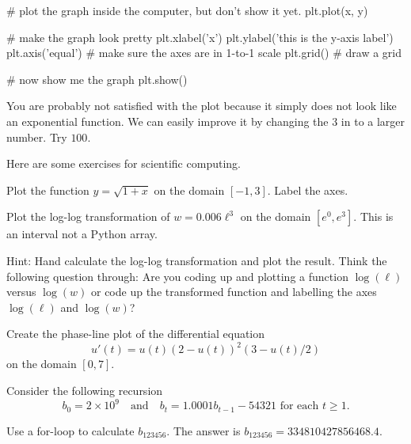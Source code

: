 \documentclass[../main.tex]{subfiles}
\begin{document}
\begin{enumerate}
\begin{pythoncode}
# plot the graph inside the computer, but don't show it yet.
plt.plot(x, y)

# make the graph look pretty
plt.xlabel('x')
plt.ylabel('this is the y-axis label')
plt.axis('equal')    # make sure the axes are in 1-to-1 scale
plt.grid()           # draw a grid

# now show me the graph
plt.show()
    \end{pythoncode}

    You are probably not satisfied with the plot because it simply does not look like an exponential function.  We can easily improve it by changing the \(3\) in  to a larger number. Try \(100\). 

\end{enumerate}


Here are some exercises for scientific computing.
\begin{computing}
  Plot the function \(y = \sqrt{1 + x}\) on the domain \([-1,3]\). Label the axes.
\end{computing}

\begin{computing}
  Plot the log-log transformation of \(w = 0.006 \ell^{3}\) on the domain \([e^{0}, e^{3}]\). This is an interval not a Python array.

  Hint: Hand calculate the log-log transformation and plot the result.  Think the following question through: Are you coding up and plotting a function \(\log(\ell)\) versus \(\log(w)\) or code up the transformed function and labelling the axes \(\log(\ell)\) and \(\log(w)\)?

\end{computing}

\begin{computing}
  Create the phase-line plot of the differential equation 
  \[
    u'(t) = u(t) (2 - u(t))^{2}(3 - u(t)/2)
  \]
  on the domain \([0, 7]\).
\end{computing}


\begin{computing}
  Consider the following recursion
  \[
    b_{0} = 2 \times 10^{9} \quad\text{and}\quad b_{t} = 1.0001 b_{t-1} - 54321 \text{ for each } t \ge 1.
  \]

  Use a for-loop to calculate \(b_{123456}\).  The answer is \(b_{123456} = 334810427856468.4\).
\end{computing}
\clearpage
\end{document}
